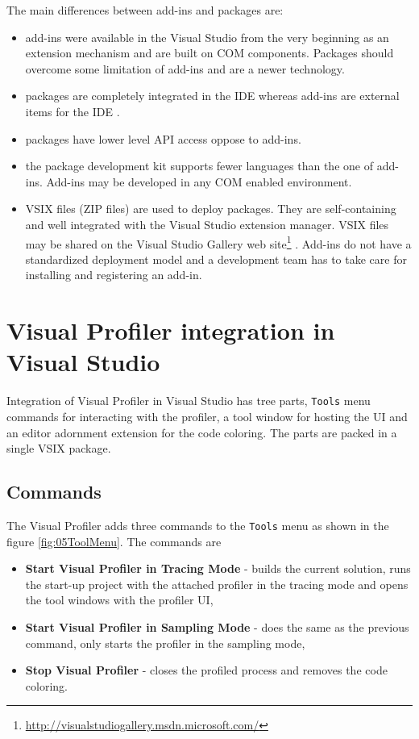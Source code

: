 The main differences between add-ins and packages are:
\begin{itemize}	
\item  add-ins were available in the Visual Studio from the very beginning as an extension mechanism and are built on COM components. Packages should overcome some limitation of add-ins and are a newer technology.

\item packages are completely integrated in the IDE whereas add-ins are external items for the IDE  .

\item packages have lower level API access oppose to add-ins.

\item the package development kit supports fewer languages than the one of add-ins. Add-ins may be developed in any COM enabled environment.

\item VSIX files (ZIP files) are used to deploy packages. They are self-containing and well integrated with the Visual Studio extension manager. VSIX files may be shared on the Visual Studio Gallery web site\footnote{\href{http://visualstudiogallery.msdn.microsoft.com/}{http://visualstudiogallery.msdn.microsoft.com/}}
. Add-ins do not have a standardized deployment model and a development team has to take care for installing and registering an add-in.
\end{itemize}


\section{Visual Profiler integration in Visual Studio}
Integration of Visual Profiler in Visual Studio has tree parts, \texttt{Tools} menu commands for interacting with the profiler, a tool window for hosting the UI and an editor adornment extension for the code coloring. The parts are packed in a single VSIX package.

\subsection{Commands}
The Visual Profiler adds three commands to the \texttt{Tools} menu as shown in the figure \ref{fig:05ToolMenu}. The commands are


\begin{itemize}
\item \textbf{Start Visual Profiler in Tracing Mode} - builds the current solution, runs the start-up project with the attached profiler in the tracing mode and opens the tool windows with the profiler UI,

\item \textbf{Start Visual Profiler in Sampling Mode} - does the same as the previous command, only  starts the profiler in the sampling mode,

\item \textbf{Stop Visual Profiler} - closes the profiled process and removes the code coloring.
\end{itemize}

